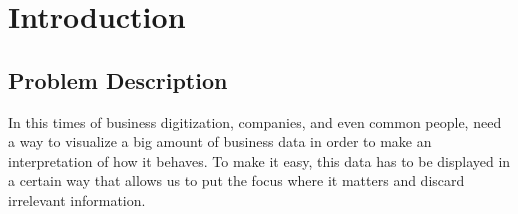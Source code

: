 \documentclass[a4paper, 12pt, english]{book}
\begin{document}


\tableofcontents
\cleardoublepage
\listoffigures %



\cleardoublepage
\chapter{Introduction}
\label{sec:introduction} %




\section{Problem Description}
\label{sec:description}

In this times of business digitization, companies, and even common people, need a way to visualize a big amount of business data in order to make an interpretation of how it behaves. To make it easy, this data has to be displayed in a certain way that allows us to put the focus where it matters and discard irrelevant information.
\end{document}
